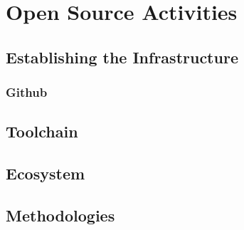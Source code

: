 ﻿\section{Open Source Activities}
\tbc[by EclipseSource]

\subsection{Establishing the Infrastructure}

\subsubsection{Github}

\subsection{Toolchain}

\subsection{Ecosystem}

\subsection{Methodologies}
